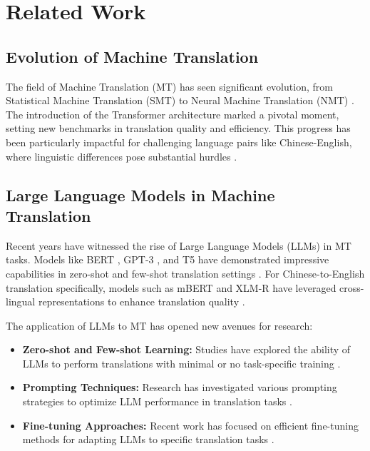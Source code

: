 \documentclass[conference]{IEEEtran}
\begin{document}
\section{Related Work}

\subsection{Evolution of Machine Translation}

The field of Machine Translation (MT) has seen significant evolution, from Statistical Machine Translation (SMT) \cite{koehn2009statistical} to Neural Machine Translation (NMT) \cite{sutskever2014sequence}. The introduction of the Transformer architecture \cite{vaswani2017attention} marked a pivotal moment, setting new benchmarks in translation quality and efficiency. This progress has been particularly impactful for challenging language pairs like Chinese-English, where linguistic differences pose substantial hurdles \cite{zhang2017improving}.

\subsection{Large Language Models in Machine Translation}

Recent years have witnessed the rise of Large Language Models (LLMs) in MT tasks. Models like BERT \cite{devlin2018bert}, GPT-3 \cite{brown2020language}, and T5 \cite{raffel2020exploring} have demonstrated impressive capabilities in zero-shot and few-shot translation settings \cite{liu2020multilingual}. For Chinese-to-English translation specifically, models such as mBERT and XLM-R have leveraged cross-lingual representations to enhance translation quality \cite{conneau2020unsupervised}.

The application of LLMs to MT has opened new avenues for research:

\begin{itemize}
    \item \textbf{Zero-shot and Few-shot Learning:} Studies have explored the ability of LLMs to perform translations with minimal or no task-specific training \cite{brown2020language}.
    \item \textbf{Prompting Techniques:} Research has investigated various prompting strategies to optimize LLM performance in translation tasks \cite{zhang2023prompting}.
    \item \textbf{Fine-tuning Approaches:} Recent work has focused on efficient fine-tuning methods for adapting LLMs to specific translation tasks \cite{zhang2023machine}.
\end{itemize}
\end{document}

